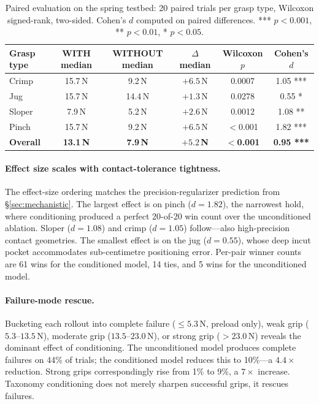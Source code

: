 \documentclass[11pt]{article}
\begin{document}
\begin{table}[h]
\centering
\caption{Paired evaluation on the spring testbed: 20 paired trials per grasp type,
Wilcoxon signed-rank, two-sided. Cohen's $d$ computed on paired differences. *** $p<0.001$,
** $p<0.01$, * $p<0.05$.}
\label{tab:paired_eval}
\begin{tabular}{lccccc}
\toprule
Grasp type & WITH median & WITHOUT median & $\Delta$ median & Wilcoxon $p$ & Cohen's $d$ \\
\midrule
Crimp  & 15.7\,N & 9.2\,N  & $+6.5$\,N & 0.0007 & 1.05 *** \\
Jug    & 15.7\,N & 14.4\,N & $+1.3$\,N & 0.0278 & 0.55 *   \\
Sloper & 7.9\,N  & 5.2\,N  & $+2.6$\,N & 0.0012 & 1.08 **  \\
Pinch  & 15.7\,N & 9.2\,N  & $+6.5$\,N & $<$0.001 & 1.82 *** \\
\midrule
\textbf{Overall} & \textbf{13.1\,N} & \textbf{7.9\,N} & \textbf{$+5.2$\,N} & \textbf{$<$0.001} & \textbf{0.95 ***} \\
\bottomrule
\end{tabular}
\end{table}

\paragraph{Effect size scales with contact-tolerance tightness.}
The effect-size ordering matches the precision-regularizer prediction from
\S\ref{sec:mechanistic}. The largest effect is on pinch ($d = 1.82$), the narrowest
hold, where conditioning produced a perfect 20-of-20 win count over the unconditioned
ablation. Sloper ($d = 1.08$) and crimp ($d = 1.05$) follow---also high-precision contact
geometries. The smallest effect is on the jug ($d = 0.55$), whose deep incut pocket
accommodates sub-centimetre positioning error. Per-pair winner counts are 61 wins for
the conditioned model, 14 ties, and 5 wins for the unconditioned model.

\paragraph{Failure-mode rescue.}
Bucketing each rollout into complete failure ($\le 5.3$\,N, preload only), weak grip
($5.3$--$13.5$\,N), moderate grip ($13.5$--$23.0$\,N), or strong grip ($> 23.0$\,N)
reveals the dominant effect of conditioning. The unconditioned model produces complete
failures on 44\% of trials; the conditioned model reduces this to 10\%---a $4.4\times$
reduction. Strong grips correspondingly rise from 1\% to 9\%, a $7\times$ increase.
Taxonomy conditioning does not merely sharpen successful grips, it rescues failures.
\end{document}
